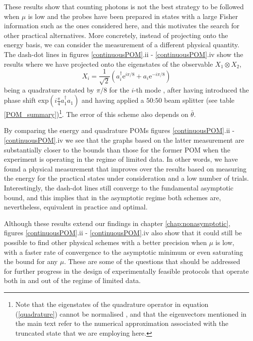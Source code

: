 These results show that counting photons is not the best strategy to be followed when $\mu$ is low and the probes have been prepared in states with a large Fisher information such as the ones considered here, and this motivates the search for other practical alternatives. More concretely, instead of projecting onto the energy basis, we can consider the measurement of a different physical quantity. The dash-dot lines in figures \ref{continuousPOM}.ii - \ref{continuousPOM}.iv show the results where we have projected onto the eigenstates of the observable $X_1\otimes X_2$,
\begin{equation}
X_i =\frac{1}{\sqrt{2}}\left(a_i^\dagger \mathrm{e}^{i\pi/8} + a_i \mathrm{e}^{-i\pi/8}\right)
\label{quadrature}
\end{equation}
being a quadrature rotated by $\pi/8$ for the $i$-th mode \cite{barnett2002}, after having introduced the phase shift $\mathrm{exp}(i \frac{\pi}{4}a_1^\dagger a_1)$ and having applied a $50$:$50$ beam splitter (see table \ref{POM_summary})\footnote{Note that the eigenstates of the quadrature operator in equation (\ref{quadrature}) cannot be normalised \cite{barnett2002}, and that the eigenvectors mentioned in the main text refer to the numerical approximation associated with the truncated state that we are employing here.}. The error of this scheme also depends on $\bar{\theta}$.

By comparing the energy and quadrature POMs figures \ref{continuousPOM}.ii - \ref{continuousPOM}.iv we see that the graphs based on the latter measurement are substantially closer to the bounds than those for the former POM when the experiment is operating in the regime of limited data. In other words, we have found a physical measurement that improves over the results based on measuring the energy for the practical states under consideration and a low number of trials. Interestingly, the dash-dot lines still converge to the fundamental asymptotic bound, and this implies that in the asymptotic regime both schemes are, nevertheless, equivalent in practice and optimal.   

Although these results extend our findings in chapter \ref{chap:nonasymptotic}, figures \ref{continuousPOM}.ii - \ref{continuousPOM}.iv also show that it could still be possible to find other physical schemes with a better precision when $\mu$ is low, with a faster rate of convergence to the asymptotic minimum or even saturating the bound for any $\mu$. These are some of the questions that should be addressed for further progress in the design of experimentally feasible protocols that operate both in and out of the regime of limited data. 


